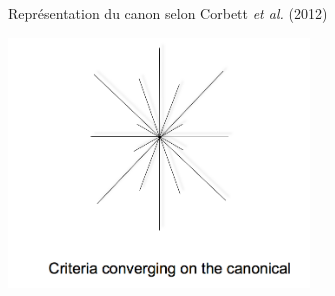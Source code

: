 \begin{frame}[t]{Représentation du canon selon Corbett {\em et al.} (2012) \nocite{corbett12imm}}
\begin{center}
\includegraphics[width=80mm]{corbett-canon-star}
\label{fig:canonicity}
\end{center}
\end{frame}
